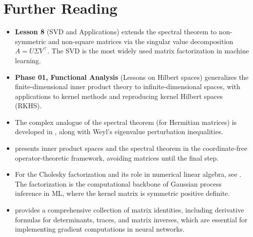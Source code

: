 \documentclass[11pt,a4paper]{article}
\begin{document}
\section{Further Reading}
\label{sec:further_reading}

\begin{itemize}
  \item \textbf{Lesson 8} (SVD and Applications) extends the spectral
        theorem to non-symmetric and non-square matrices via the singular
        value decomposition $A = U\Sigma V^\top$.  The SVD is the most
        widely used matrix factorization in machine learning.

  \item \textbf{Phase 01, Functional Analysis} (Lessons on Hilbert spaces)
        generalizes the finite-dimensional inner product theory to
        infinite-dimensional spaces, with applications to kernel methods
        and reproducing kernel Hilbert spaces (RKHS).

  \item The complex analogue of the spectral theorem (for Hermitian
        matrices) is developed in \citet[Chapter~4]{horn2013}, along with
        Weyl's eigenvalue perturbation inequalities.

  \item \citet[Chapter~6]{axler2015} presents inner product spaces
        and the spectral theorem in the coordinate-free operator-theoretic
        framework, avoiding matrices until the final step.

  \item For the Cholesky factorization and its role in numerical linear
        algebra, see \citet[Chapter~6]{strang2016}.  The factorization
        is the computational backbone of Gaussian process inference in ML,
        where the kernel matrix is symmetric positive definite.

  \item \citet{petersen2012} provides a comprehensive collection of matrix
        identities, including derivative formulas for determinants, traces,
        and matrix inverses, which are essential for implementing gradient
        computations in neural networks.
\end{itemize}


\end{document}

